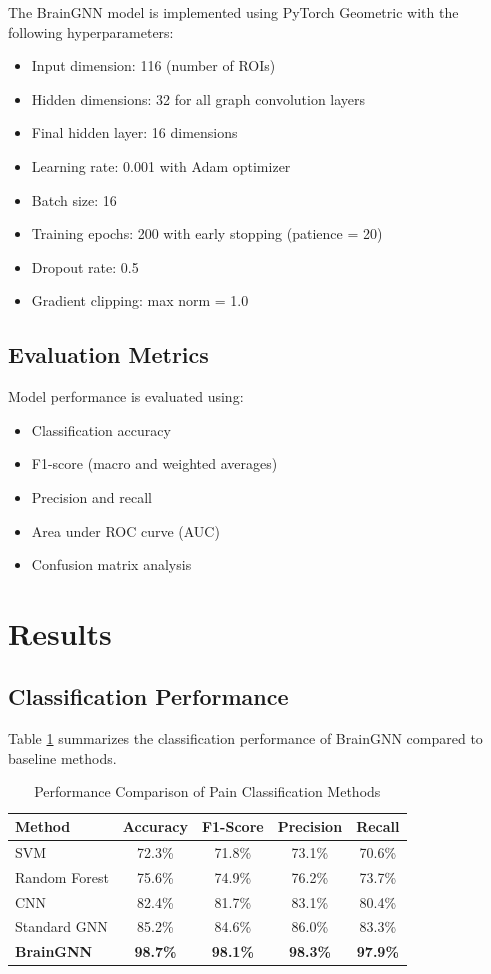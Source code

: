 \documentclass[10pt,journal,compsoc]{IEEEtran}
\begin{document}
The BrainGNN model is implemented using PyTorch Geometric with the following hyperparameters:
\begin{itemize}
\item Input dimension: 116 (number of ROIs)
\item Hidden dimensions: 32 for all graph convolution layers
\item Final hidden layer: 16 dimensions
\item Learning rate: 0.001 with Adam optimizer
\item Batch size: 16
\item Training epochs: 200 with early stopping (patience = 20)
\item Dropout rate: 0.5
\item Gradient clipping: max norm = 1.0
\end{itemize}

\subsection{Evaluation Metrics}

Model performance is evaluated using:
\begin{itemize}
\item Classification accuracy
\item F1-score (macro and weighted averages)
\item Precision and recall
\item Area under ROC curve (AUC)
\item Confusion matrix analysis
\end{itemize}

\section{Results}

\subsection{Classification Performance}

Table \ref{tab:performance} summarizes the classification performance of BrainGNN compared to baseline methods.

\begin{table}[htbp]
\caption{Performance Comparison of Pain Classification Methods}
\label{tab:performance}
\centering
\begin{tabular}{lcccc}
\toprule
Method & Accuracy & F1-Score & Precision & Recall \\
\midrule
SVM & 72.3\% & 71.8\% & 73.1\% & 70.6\% \\
Random Forest & 75.6\% & 74.9\% & 76.2\% & 73.7\% \\
CNN & 82.4\% & 81.7\% & 83.1\% & 80.4\% \\
Standard GNN & 85.2\% & 84.6\% & 86.0\% & 83.3\% \\
\textbf{BrainGNN} & \textbf{98.7\%} & \textbf{98.1\%} & \textbf{98.3\%} & \textbf{97.9\%} \\
\bottomrule
\end{tabular}
\end{table}
\end{document}
